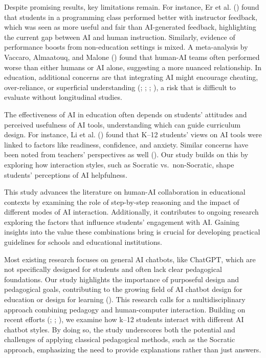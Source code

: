 \documentclass[
  12pt,
]{article}
\begin{document}
Despite promising results, key limitations remain. For instance, Er et al. () found that students in a programming class performed better with instructor feedback, which was seen as more useful and fair than AI-generated feedback, highlighting the current gap between AI and human instruction. Similarly, evidence of performance boosts from non-education settings is mixed. A meta-analysis by Vaccaro, Almaatouq, and Malone () found that human-AI teams often performed worse than either humans or AI alone, suggesting a more nuanced relationship. In education, additional concerns are that integrating AI might encourage cheating, over-reliance, or superficial understanding (; ; ; ), a risk that is difficult to evaluate without longitudinal studies.

The effectiveness of AI in education often depends on students' attitudes and perceived usefulness of AI tools, understanding which can guide curriculum design. For instance, Li et al. () found that K--12 students' views on AI tools were linked to factors like readiness, confidence, and anxiety. Similar concerns have been noted from teachers' perspectives as well (). Our study builds on this by exploring how interaction styles, such as Socratic vs.~non-Socratic, shape students' perceptions of AI helpfulness.

This study advances the literature on human-AI collaboration in educational contexts by examining the role of step-by-step reasoning and the impact of different modes of AI interaction. Additionally, it contributes to ongoing research exploring the factors that influence students' engagement with AI. Gaining insights into the value these combinations bring is crucial for developing practical guidelines for schools and educational institutions.

Most existing research focuses on general AI chatbots, like ChatGPT, which are not specifically designed for students and often lack clear pedagogical foundations. Our study highlights the importance of purposeful design and pedagogical goals, contributing to the growing field of AI chatbot design for education or design for learning (). This research calls for a multidisciplinary approach combining pedagogy and human-computer interaction. Building on recent efforts (; ; ), we examine how k--12 students interact with different AI chatbot styles. By doing so, the study underscores both the potential and challenges of applying classical pedagogical methods, such as the Socratic approach, emphasizing the need to provide explanations rather than just answers.
\end{document}

